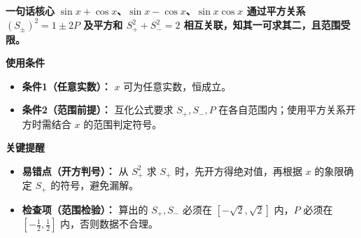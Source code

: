 \begin{summarybox}
	\textbf{\textcolor{CSummary}{一句话核心}}
	\textbf{$\sin x+\cos x$、$\sin x-\cos x$、$\sin x\cos x$ 通过平方关系 $(S_\pm)^2=1\pm 2P$ 及平方和 $S_+^2+S_-^2=2$ 相互关联，知其一可求其二，且范围受限。}

	\medskip
	\textbf{\textcolor{CSummary}{使用条件}}
	\begin{itemize}[leftmargin=*, itemsep=0.5em, topsep=0.4em]
		\item \textbf{条件1（任意实数）：} $x$ 可为任意实数，恒成立。
		\item \textbf{条件2（范围前提）：} 互化公式要求 $S_+,S_-,P$ 在各自范围内；使用平方关系开方时需结合 $x$ 的范围判定符号。
	\end{itemize}

	\medskip
	\textbf{\textcolor{CSummary}{关键提醒}}
	\begin{itemize}[leftmargin=*, itemsep=0.5em, topsep=0.4em]
		\item \textbf{易错点（开方判号）：} 从 $S_+^2$ 求 $S_+$ 时，先开方得绝对值，再根据 $x$ 的象限确定 $S_+$ 的符号，避免漏解。
		\item \textbf{检查项（范围检验）：} 算出的 $S_+,S_-$ 必须在 $[-\sqrt2,\sqrt2]$ 内，$P$ 必须在 $[-\frac12,\frac12]$ 内，否则数据不合理。
	\end{itemize}

\end{summarybox}
